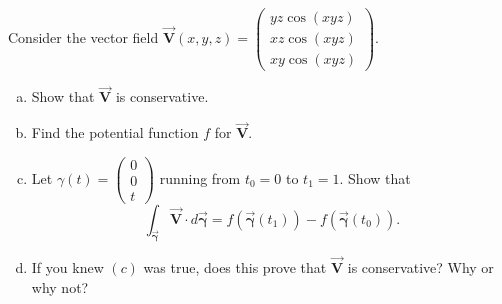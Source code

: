 \documentclass[12pt]{article} %
\newcommand{\vecfieldV}{\boldsymbol{\vec{V}}}
\newcommand{\curvegamma}{\boldsymbol{\vec{\gamma}}}
\begin{document}
\newpage
\begin{problem}
    Consider the vector field $\vecfieldV(x,y,z) = \begin{pmatrix} yz \cos(xyz) \\ xz \cos(xyz) \\ xy \cos(xyz) \end{pmatrix}$. 
\begin{enumerate}[(a)]
    \item Show that $\vecfieldV$ is conservative.
    \item Find the potential function $f$ for $\vecfieldV$.
    \item Let $\gamma(t) = \begin{pmatrix} 0 \\ 0 \\ t \end{pmatrix}$ running from $t_0=0$ to $t_1=1$. Show that
    \[
    \int_{\curvegamma} \vecfieldV \cdot d \curvegamma = f(\curvegamma(t_1))-f(\curvegamma(t_0)).
    \]
    \item If you knew $(c)$ was true, does this prove that $\vecfieldV$ is conservative? Why or why not?
\end{enumerate}
\end{problem}
\begin{solution}

\end{solution}
\end{document}
